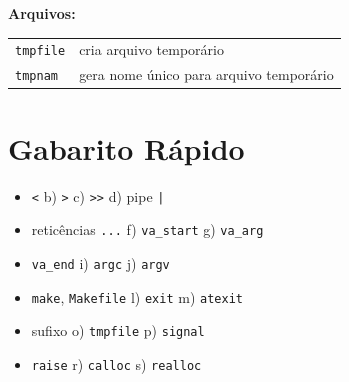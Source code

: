 \documentclass[12pt,a4paper]{article}
\begin{document}
\begin{tcolorbox}[colback=deitelgray,colframe=deitelblue,title={\bfseries Mapa de funções por categoria}]
\textbf{Arquivos:}
\begin{center}
\begin{tabular}{l l}
\toprule
\texttt{tmpfile}  & cria arquivo temporário \\
\texttt{tmpnam}   & gera nome único para arquivo temporário \\
\bottomrule
\end{tabular}
\end{center}

\end{tcolorbox}

\section*{Gabarito Rápido}

\begin{tcolorbox}[colback=deitellightblue,colframe=deitelblue,
  title={\bfseries\large Respostas Resumidas -- 14.1}]
\begin{itemize}[noitemsep]
  \item[a)] \texttt{<} \quad b) \texttt{>} \quad c) \texttt{>>} \quad d) pipe \texttt{|}
  \item[e)] reticências \texttt{...} \quad f) \texttt{va\_start} \quad g) \texttt{va\_arg}
  \item[h)] \texttt{va\_end} \quad i) \texttt{argc} \quad j) \texttt{argv}
  \item[k)] \texttt{make}, \texttt{Makefile} \quad l) \texttt{exit} \quad m) \texttt{atexit}
  \item[n)] sufixo \quad o) \texttt{tmpfile} \quad p) \texttt{signal}
  \item[q)] \texttt{raise} \quad r) \texttt{calloc} \quad s) \texttt{realloc}
\end{itemize}
\end{tcolorbox}
\end{document}
